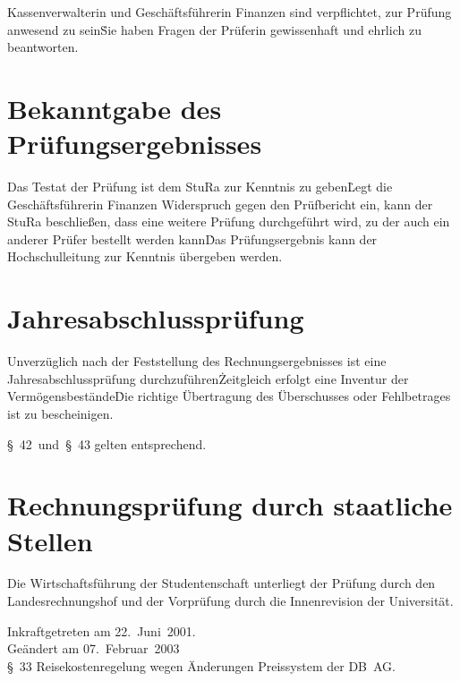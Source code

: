 \begin{multicols}{2}
\Abs \Satz Kassenverwalterin und Geschäftsführerin Finanzen sind verpflichtet, zur Prüfung anwesend zu sein\. Sie haben Fragen der Prüferin gewissenhaft und ehrlich zu beantworten.



\section{Bekanntgabe des Prüfungsergebnisses}

\Abs \Satz Das Testat der Prüfung ist dem StuRa zur Kenntnis zu geben\. Legt die Geschäftsführerin Finanzen Widerspruch gegen den Prüfbericht ein, kann der StuRa beschließen, dass eine weitere Prüfung durchgeführt wird, zu der auch ein anderer Prüfer bestellt werden kann\. Das Prüfungsergebnis kann der Hochschulleitung zur Kenntnis übergeben werden.



\section{Jahresabschlussprüfung}

\Abs \Satz Unverzüglich nach der Feststellung des Rechnungsergebnisses ist eine Jahresabschlussprüfung durchzuführen\. Zeitgleich erfolgt eine Inventur der Vermögensbestände\. Die richtige Übertragung des Überschusses oder Fehlbetrages ist zu bescheinigen.

\Abs \Satz §~42~und~§~43 gelten entsprechend.

\section{Rechnungsprüfung durch staatliche Stellen}

\Abs \Satz Die Wirtschaftsführung der Studentenschaft unterliegt der Prüfung durch den Landesrechnungshof und der Vorprüfung durch die Innenrevision der Universität.

\end{multicols}

\nopagebreak
\vspace{1cm}
Inkraftgetreten am 22.~Juni~2001.
\\


\footnotesize
Geändert am 07.~Februar~2003\\
§~33 Reisekostenregelung wegen Änderungen Preissystem der DB~AG.

